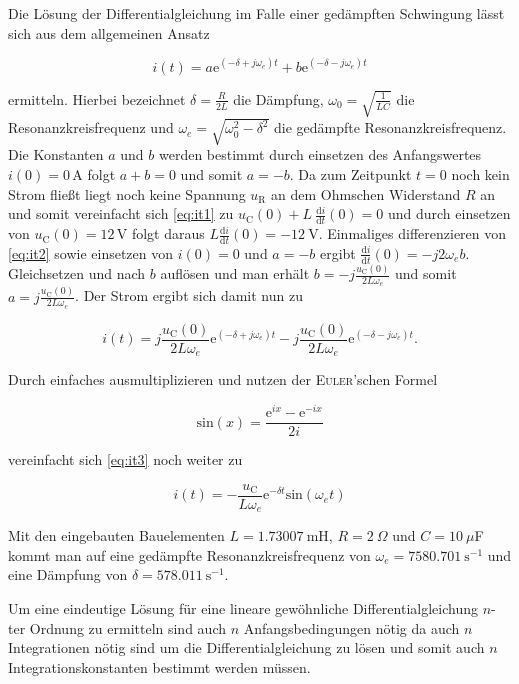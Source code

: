 	
	
	Die Lösung der Differentialgleichung im Falle einer gedämpften Schwingung lässt sich aus dem allgemeinen Ansatz 
	
	\begin{equation}
			i(t) = a\mathrm{e}^{(-\delta +j\omega_e)t} + b\mathrm{e}^{(-\delta - j\omega_e)t}
			\label{eq:it2}
	\end{equation}
	
	ermitteln. Hierbei bezeichnet $\delta = \frac{R}{2L}$ die Dämpfung, $\omega_0 = \sqrt{\frac{1}{LC}}$ die Resonanzkreisfrequenz und $\omega_e = \sqrt{\omega_0^2 - \delta^2}$ die gedämpfte Resonanzkreisfrequenz. Die Konstanten $a$ und $b$ werden bestimmt durch einsetzen des Anfangswertes  $i(0) = 0\,$A folgt $a + b = 0$ und somit $a = -b$.\newline
	Da zum Zeitpunkt $t = 0$ noch kein Strom fließt liegt noch keine Spannung $u_\mathrm{R}$ an dem Ohmschen Widerstand $R$ an und somit vereinfacht sich \ref{eq:it1} zu $u_\mathrm{C}(0) +  L\: \frac{\mathrm{d}i}{\mathrm{d}t}(0) = 0$ und durch einsetzen von $u_\mathrm{C}(0) = 12\,$V folgt daraus $L\frac{\mathrm{d}i}{\mathrm{d}t}(0) = -12\:$V. Einmaliges differenzieren von \ref{eq:it2} sowie einsetzen von $ i(0) = 0$ und $a = -b$ ergibt $\frac{\mathrm{d}i}{\mathrm{d}t}(0) = -j2\omega_e b$. Gleichsetzen und nach $b$ auflösen und man erhält $b = -j \frac{u_\mathrm{C}(0)}{2L\omega_e}$ und somit $a = j\frac{u_\mathrm{C}(0)}{2L\omega_e}$. Der Strom ergibt sich damit nun zu 
	
	\begin{equation}
		i(t) = j\frac{u_\mathrm{C}(0)}{2L\omega_e}\mathrm{e}^{(-\delta +j\omega_e)t} - j \frac{u_\mathrm{C}(0)}{2L\omega_e}\mathrm{e}^{(-\delta - j\omega_e)t}.
		\label{eq:it3}
	\end{equation}
	
	Durch einfaches ausmultiplizieren und nutzen der \textsc{Euler}'schen Formel 
	
	\begin{equation*}
		\mathrm{sin}(x) = \frac{\mathrm{e}^{ix} - \mathrm{e}^{-ix}}{2i}
	\end{equation*}
	
	vereinfacht sich \ref{eq:it3} noch weiter zu
	
	\begin{equation*}
		i(t) = -\frac{u_\mathrm{C}}{L\omega_e}\mathrm{e}^{-\delta t}\mathrm{sin}(\omega_et)
	\end{equation*}
	
	Mit den eingebauten Bauelementen $L = 1.73007\:$mH, $R = 2\:\Omega$ und $C = 10 \: \mu $F kommt man auf eine gedämpfte Resonanzkreisfrequenz von $\omega_e = 7580.701\:\mathrm{s}^{-1}$ und eine Dämpfung von $\delta = 578.011\:\mathrm{s}^{-1}$.\newline
	
	Um eine eindeutige Lösung für eine lineare gewöhnliche Differentialgleichung $n$-ter Ordnung zu ermitteln sind auch $n$ Anfangsbedingungen nötig da auch $n$ Integrationen nötig sind um die Differentialgleichung zu lösen und somit auch $n$ Integrationskonstanten bestimmt werden müssen.


